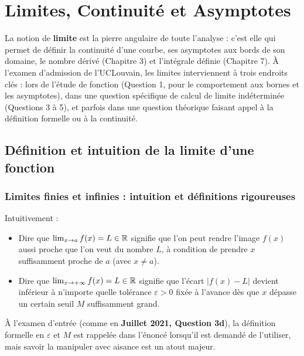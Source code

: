 \chapter{Limites, Continuité et Asymptotes}

La notion de \textbf{limite} est la pierre angulaire de toute l'analyse : c'est elle qui permet de définir la continuité d'une courbe, ses asymptotes aux bords de son domaine, le nombre dérivé (Chapitre 3) et l'intégrale définie (Chapitre 7). À l'examen d'admission de l'UCLouvain, les limites interviennent à trois endroits clés : lors de l'étude de fonction (Question 1, pour le comportement aux bornes et les asymptotes), dans une question spécifique de calcul de limite indéterminée (Questions 3 à 5), et parfois dans une question théorique faisant appel à la définition formelle ou à la continuité.

\section{Définition et intuition de la limite d'une fonction}

\subsection{Limites finies et infinies : intuition et définitions rigoureuses}

Intuitivement :
\begin{itemize}
    \item Dire que $\lim_{x \to a} f(x) = L \in \mathbb{R}$ signifie que l'on peut rendre l'image $f(x)$ aussi proche que l'on veut du nombre $L$, à condition de prendre $x$ suffisamment proche de $a$ (avec $x \neq a$).
    \item Dire que $\lim_{x \to +\infty} f(x) = L \in \mathbb{R}$ signifie que l'écart $|f(x) - L|$ devient inférieur à n'importe quelle tolérance $\varepsilon > 0$ fixée à l'avance dès que $x$ dépasse un certain seuil $M$ suffisamment grand.
\end{itemize}

À l'examen d'entrée (comme en \textbf{Juillet 2021, Question 3d}), la définition formelle en $\varepsilon$ et $M$ est rappelée dans l'énoncé lorsqu'il est demandé de l'utiliser, mais savoir la manipuler avec aisance est un atout majeur.


